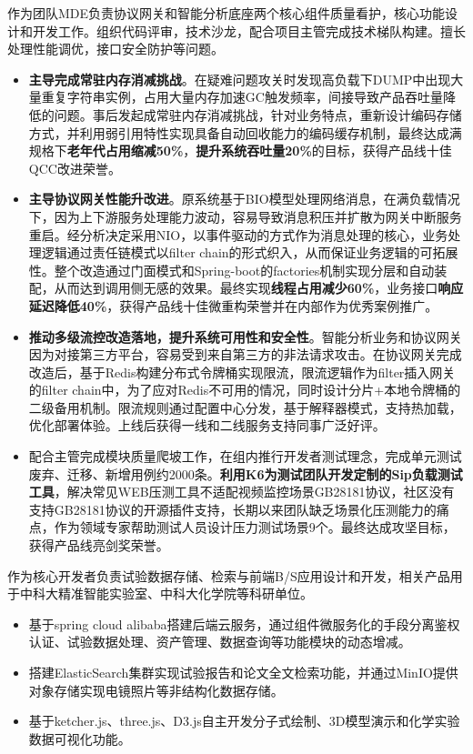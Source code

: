 \documentclass{resume}
\begin{document}
\begin{onehalfspacing}
作为团队MDE负责协议网关和智能分析底座两个核心组件质量看护，核心功能设计和开发工作。组织代码评审，技术沙龙，配合项目主管完成技术梯队构建。擅长处理性能调优，接口安全防护等问题。
\begin{itemize}
  \item \textbf{主导完成常驻内存消减挑战}。在疑难问题攻关时发现高负载下DUMP中出现大量重复字符串实例，占用大量内存加速GC触发频率，间接导致产品吞吐量降低的问题。事后发起成常驻内存消减挑战，针对业务特点，重新设计编码存储方式，并利用弱引用特性实现具备自动回收能力的编码缓存机制，最终达成满规格下\textbf{老年代占用缩减50\%}，\textbf{提升系统吞吐量20\%}的目标，获得产品线十佳QCC改进荣誉。
  \item \textbf{主导协议网关性能升改进}。原系统基于BIO模型处理网络消息，在满负载情况下，因为上下游服务处理能力波动，容易导致消息积压并扩散为网关中断服务重启。经分析决定采用NIO，以事件驱动的方式作为消息处理的核心，业务处理逻辑通过责任链模式以filter chain的形式织入，从而保证业务逻辑的可拓展性。整个改造通过门面模式和Spring-boot的factories机制实现分层和自动装配，从而达到调用侧无感的效果。最终实现\textbf{线程占用减少60\%}，业务接口\textbf{响应延迟降低40\%}，获得产品线十佳微重构荣誉并在内部作为优秀案例推广。
  \item \textbf{推动多级流控改造落地，提升系统可用性和安全性}。智能分析业务和协议网关因为对接第三方平台，容易受到来自第三方的非法请求攻击。在协议网关完成改造后，基于Redis构建分布式令牌桶实现限流，限流逻辑作为filter插入网关的filter chain中，为了应对Redis不可用的情况，同时设计分片+本地令牌桶的二级备用机制。限流规则通过配置中心分发，基于解释器模式，支持热加载，优化部署体验。上线后获得一线和二线服务支持同事广泛好评。
  \item 配合主管完成模块质量爬坡工作，在组内推行开发者测试理念，完成单元测试废弃、迁移、新增用例约2000条。\textbf{利用K6为测试团队开发定制的Sip负载测试工具}，解决常见WEB压测工具不适配视频监控场景GB28181协议，社区没有支持GB28181协议的开源插件支持，长期以来团队缺乏场景化压测能力的痛点，作为领域专家帮助测试人员设计压力测试场景9个。最终达成攻坚目标，获得产品线亮剑奖荣誉。
\end{itemize}
\end{onehalfspacing}

\begin{onehalfspacing}
作为核心开发者负责试验数据存储、检索与前端B/S应用设计和开发，相关产品用于中科大精准智能实验室、中科大化学院等科研单位。
\begin{itemize}
  \item 基于spring cloud alibaba搭建后端云服务，通过组件微服务化的手段分离鉴权认证、试验数据处理、资产管理、数据查询等功能模块的动态增减。
  \item 搭建ElasticSearch集群实现试验报告和论文全文检索功能，并通过MinIO提供对象存储实现电镜照片等非结构化数据存储。
  \item 基于ketcher.js、three.js、D3.js自主开发分子式绘制、3D模型演示和化学实验数据可视化功能。
\end{itemize}
\end{onehalfspacing}
\end{document}
